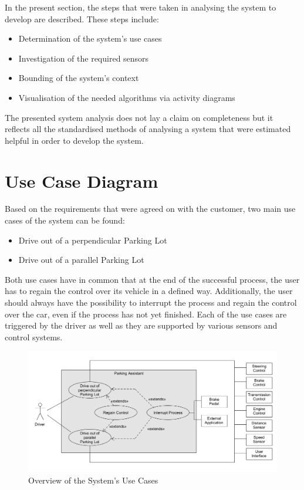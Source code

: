 In the present section, the steps that were taken in analysing the system to
develop are described. These steps include:

\begin{itemize}
\item{Determination of the system's use cases}
\item{Investigation of the required sensors}
\item{Bounding of the system's context}
\item{Visualisation of the needed algorithms via activity diagrams}
\end{itemize}

The presented system analysis does not lay a claim on completeness but it
reflects all the standardised methods of analysing a system that were estimated
helpful in order to develop the system.

\section{Use Case Diagram}

Based on the requirements that were agreed on with the customer, two main use
cases of the system can be found:
\newpage
\begin{itemize}
\item{Drive out of a perpendicular Parking Lot}
\item{Drive out of a parallel Parking Lot}
\end{itemize}

Both use cases have in common that at the end of the successful process, the
user has to regain the control over its vehicle in a defined way. Additionally,
the user should always have the possibility to interrupt the process and regain
the control over the car, even if the process has not yet finished. Each of the
use cases are triggered by the driver as well as they are supported by various
sensors and control systems.

\begin{figure}
\centering
\captionsetup{justification=centering}
\includegraphics[width=\textwidth]{res/systemAnalysis/UseCase.png}
\caption{Overview of the System's Use Cases}
\label{fig:UseCases}
\end{figure}


